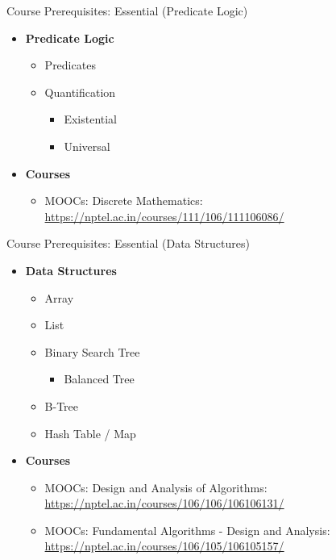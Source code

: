 \documentclass[aspectratio=169, xcolor=dvipsnames]{beamer}
\begin{document}
\begin{frame}{Course Prerequisites: Essential (Predicate Logic)}
    \begin{itemize}[<+->]
        \item \textbf{Predicate Logic}
        \begin{itemize}
            \item Predicates
            \item Quantification
            \begin{itemize}
                \item[$\triangleright$] Existential
                \item[$\triangleright$] Universal
            \end{itemize}
        \end{itemize}
        \item \textbf{Courses}
        \begin{itemize}
            \item[$\triangleright$] MOOCs: Discrete Mathematics: \\
            \url{https://nptel.ac.in/courses/111/106/111106086/}
        \end{itemize}
    \end{itemize}
\end{frame}

\begin{frame}{Course Prerequisites: Essential (Data Structures)}
    \begin{itemize}[<+->]
        \item \textbf{Data Structures}
        \begin{itemize}
            \item Array
            \item List
            \item Binary Search Tree
            \begin{itemize}
                \item[$\triangleright$] Balanced Tree
            \end{itemize}
            \item B-Tree
            \item Hash Table / Map
        \end{itemize}
        \item \textbf{Courses}
        \begin{itemize}
            \item[$\triangleright$] MOOCs: Design and Analysis of Algorithms: \\
            \url{https://nptel.ac.in/courses/106/106/106106131/}
            \item[$\triangleright$] MOOCs: Fundamental Algorithms - Design and Analysis: \\
            \url{https://nptel.ac.in/courses/106/105/106105157/}
        \end{itemize}
    \end{itemize}
\end{frame}
\end{document}
